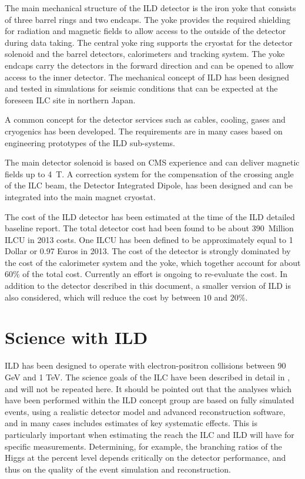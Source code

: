 \documentclass[%
 amsmath,amssymb,
 aps,
 longbibliography,
]{revtex4-1}
\begin{document}
The main mechanical structure of the ILD detector is the iron yoke that consists of three barrel rings and two endcaps. The yoke provides the required shielding for radiation and magnetic fields to allow access to the outside of the detector during data taking. The central yoke ring supports the cryostat for the detector solenoid and the barrel detectors, calorimeters and tracking system. The yoke endcaps carry the detectors in the forward direction and can be opened to allow access to the inner detector. The mechanical concept of ILD has been designed and tested in simulations for seismic conditions that can be expected at the foreseen ILC site in northern Japan.

A common concept for the detector services such as cables, cooling, gases and cryogenics has been developed. The requirements are in many cases based on engineering prototypes of the ILD sub-systems. 

The main detector solenoid is based on CMS experience and can deliver magnetic fields up to 4~T. A correction system for the compensation of the crossing angle of the ILC beam, the Detector Integrated Dipole, has been designed and can be integrated into the main magnet cryostat.

The cost of the ILD detector has been estimated at the time of the ILD detailed baseline report. The total detector cost had been found to be about $390$~Million ILCU in 2013 costs. One ILCU has been defined to be approximately equal to 1\, Dollar or 0.97 Euros in 2013. The cost of the detector is strongly dominated by the cost of the calorimeter system and the yoke, which together account for about $60\%$ of the total cost. Currently an effort is ongoing to re-evaluate the cost. In addition to the detector described in this document, a smaller version of ILD is also considered, which will reduce the cost by between $10$ and $20\%$. 

\section{Science with ILD}
ILD has been designed to operate with electron-positron collisions between 90 GeV and 1 TeV. The science goals of the ILC have been described in detail in \cite{ILCESU1}, and will not be repeated here. It should be pointed out that the analyses which have been performed within the ILD concept group are based on fully simulated events, using a realistic detector model and advanced reconstruction software, and in many cases includes estimates of key systematic effects. This is particularly important when estimating the reach the ILC and ILD will have for specific measurements. Determining, for example, the branching ratios of the Higgs at the percent level depends critically on the detector performance, and thus on the quality of the event simulation and reconstruction. 
\end{document}

